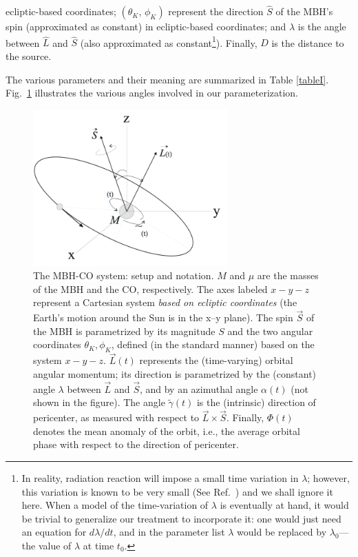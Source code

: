 \documentclass[11pt]{report}
\begin{document}
ecliptic-based coordinates; $(\theta_K,\,\phi_K)$ represent the direction
$\hat S$ of the MBH's spin (approximated as constant) in ecliptic-based
coordinates; and $\lambda$ is the angle between $\hat L$ and $\hat S$ (also
approximated as constant\footnote
{In reality, radiation reaction will impose a small time variation in
$\lambda$; however, this variation is known to be very small
(See Ref.\ \cite{scott1}) and we shall ignore
it here. When a model of the time-variation of $\lambda$ is eventually
at hand, it would be trivial to generalize our treatment to
incorporate it: one would just need an equation for $d\lambda/dt$,
and in the parameter list $\lambda$ would be replaced by
$\lambda_0$---the value of $\lambda$ at time $t_0$.}).
Finally, $D$ is the distance to the source.

The various parameters and their meaning are summarized in Table
\ref{tableI}. Fig.\ \ref{fig1} illustrates the various angles involved
in our parameterization.

\begin{figure}[htb]

\centerline{\includegraphics[height=6cm]{system}}
\caption{\protect\footnotesize
The MBH-CO system: setup and notation.
$M$ and $\mu$ are the masses of the MBH and the CO, respectively.
The axes labeled $x{-}y{-}z$ represent a Cartesian system {\em based on
ecliptic coordinates} (the Earth's motion around
the Sun is in the x--y plane). The spin $\vec S$ of the MBH is parametrized
by its magnitude $S$ and the two angular coordinates $\theta_K,\phi_K$,
defined (in the standard manner) based on the system $x{-}y{-}z$.
$\vec L(t)$ represents the (time-varying) orbital angular momentum;
its direction is parametrized by the (constant) angle $\lambda$ between
$\vec L$ and $\vec S$, and by an azimuthal angle $\alpha(t)$ (not
shown in the figure).
The angle $\tilde\gamma(t)$ is the (intrinsic) direction of pericenter,
as measured with respect to $\vec L\times\vec S$. Finally,
$\Phi(t)$ denotes the mean anomaly of the orbit, i.e., the average
orbital phase with respect to the direction of pericenter.}
\label{fig1}
\end{figure}
\end{document}
